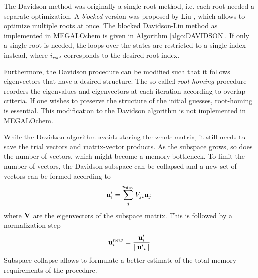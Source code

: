 The Davidson method was originally a single-root method, i.e. each root needed a separate optimization. A \emph{blocked} version was proposed by Liu \cite{Liu1978}, which allows to optimize multiple roots at once. The blocked Davidson-Liu method as implemented in MEGALOchem is given in Algorithm \ref{algo:DAVIDSON}. If only a single root is needed, the loops over the states are restricted to a single index instead, where $i_{root}$ corresponds to the desired root index. 

Furthermore, the Davidson procedure can be modified such that it follows eigenvectors that have a desired structure. The so-called \emph{root-homing} procedure \cite{But1976} reorders the eigenvalues and eigenvectors at each iteration according to overlap criteria. If one wishes to preserve the structure of the initial guesses, root-homing is essential. This modification to the Davidson algorithm is not implemented in MEGALOchem.

While the Davidson algorithm avoids storing the whole matrix, it still needs to save the trial vectors and matrix-vector products. As the subspace grows, so does the number of vectors, which might become a memory bottleneck. To limit the number of vectors, the Davidson subspace can be collapsed and a new set of vectors can be formed according to
\begin{equation}
\mathbf{u}'_i = \sum_j^{n_{dav}} V_{ji} \mathbf{u}_j
\label{eq:COLLAPSE1} 
\end{equation}
\noindent where $\mathbf{V}$ are the eigenvectors of the subspace matrix. This is followed by a normalization step
\begin{equation}
\mathbf{u}^{new}_i = \frac{\mathbf{u}'_i}{\left\lVert \mathbf{u'}_i \right\rVert}
\label{eq:COLLAPSE2}
\end{equation}
\noindent Subspace collapse allows to formulate a better estimate of the total memory requirements of the procedure. 


